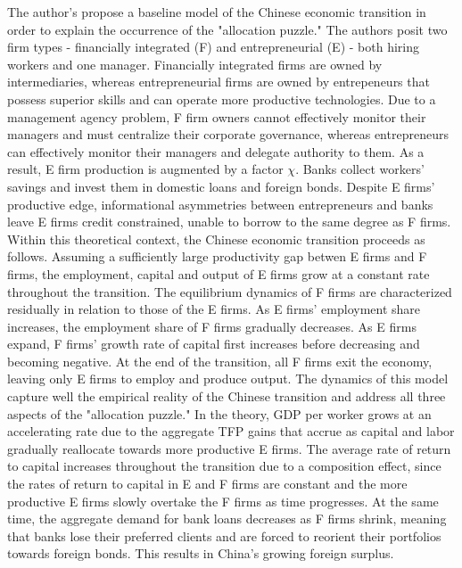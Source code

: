 \documentclass{article}
\begin{document}
The author's propose a baseline model of the Chinese economic transition in order to explain the occurrence of 
the "allocation puzzle." The authors posit two firm types - financially integrated (F) and entrepreneurial (E) - both
hiring workers and one manager. Financially integrated firms are owned by intermediaries, whereas entrepreneurial
firms are owned by entrepeneurs that possess superior skills and can operate more productive technologies. Due to 
a management agency problem, F firm owners cannot effectively monitor their managers and must centralize their 
corporate governance, whereas entrepreneurs can effectively monitor their managers and delegate authority to them. 
As a result, E firm production is augmented by a factor $\chi$. Banks collect workers' savings and invest them in 
domestic loans and foreign bonds. Despite E firms' productive edge, informational asymmetries between entrepreneurs
and banks leave E firms credit constrained, unable to borrow to the same degree as F firms. Within this theoretical 
context, the Chinese economic transition proceeds as follows. Assuming a sufficiently large productivity gap
betwen E firms and F firms, the employment, capital and output of E firms grow at a constant rate throughout 
the transition. The equilibrium dynamics of F firms are characterized residually in relation to those of 
the E firms. As E firms' employment share increases, the employment share of F firms gradually decreases. As E firms
expand, F firms' growth rate of capital first increases before decreasing and becoming negative. At the end of the transition,
all F firms exit the economy, leaving only E firms to employ and produce output. The dynamics of this model capture well
the empirical reality of the Chinese transition and address all three aspects of the "allocation puzzle." In the theory,
GDP per worker grows at an accelerating rate due to the aggregate TFP gains that accrue as capital and labor gradually 
reallocate towards more productive E firms. The average rate of return to capital increases throughout the transition due to a composition effect,
since the rates of return to capital in E and F firms are constant and the more productive E firms slowly overtake the F firms 
as time progresses. At the same time, the aggregate demand for bank loans decreases as F firms shrink, meaning 
that banks lose their preferred clients and are forced to reorient their portfolios towards foreign bonds. This 
results in China's growing foreign surplus.  
\\
\end{document}
